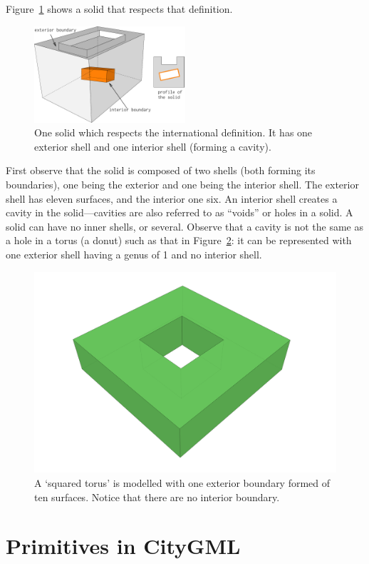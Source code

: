 \documentclass[a4paper,parskip=half,11pt]{scrartcl}
\begin{document}
Figure~\ref{fig:onesolid} shows a solid that respects that definition.
\begin{figure}
  \centering
  \includegraphics[width=0.5\textwidth]{figs/isosolid.pdf}
  \caption{One solid which respects the international definition. It has one exterior shell and one interior shell (forming a cavity).}\label{fig:onesolid}
\end{figure}
First observe that the solid is composed of two shells (both forming its boundaries), one being the exterior and one being the interior shell.
The exterior shell has eleven surfaces, and the interior one six.
An interior shell creates a cavity in the solid---cavities are also referred to as ``voids'' or holes in a solid.
A solid can have no inner shells, or several.
Observe that a cavity is not the same as a hole in a torus (a donut) such as that in Figure~\ref{fig:torus}: it can be represented with one exterior shell having a genus of 1 and no interior shell.
\begin{figure}
  \centering
  \includegraphics[width=0.5\linewidth]{figs/torus.png}
  \caption{A `squared torus' is modelled with one exterior boundary formed of ten surfaces. Notice that there are no interior boundary.}
\label{fig:torus}
\end{figure}


%
\section{Primitives in CityGML}
\end{document}
